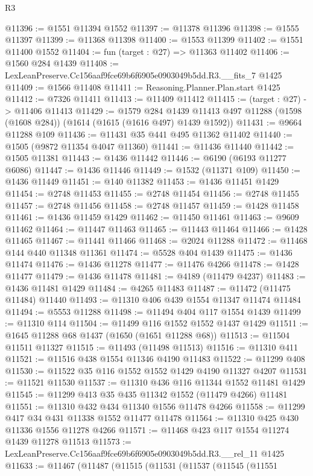 \begin{lexlean}{R3}
\begin{coremodule}
@11396 := @1551 @11394 @1552
@11397 := @11378 @11396
@11398 := @1555 @11397
@11399 := @11368 @11398
@11400 := @1553 @11399
@11402 := @1551 @11400 @1552
@11404 := fun (target : @27) => @11363 @11402
@11406 := @1560 @284 @1439
@11408 := LexLeanPreserve.Cc156aaf9fce69b6f6905e0903049b5dd.R3.__fits_7 @1425
@11409 := @1566 @11408
@11411 := Reasoning.Planner.Plan.start @1425
@11412 := @7326 @11411
@11413 := @11409 @11412
@11415 := (target : @27) -> @11406 @11413
@11429 := @1579
    @284
    @1439
    @11413
    @497
    @11288
    (@1598 (@1608 @284))
    (@1614 (@1615 (@1616 @497) @1439 @1592))
@11431 := @9664 @11288 @109
@11436 := @11431 @35 @441 @495 @11362 @11402
@11440 := @1505 (@9872 @11354 @4047 @11360)
@11441 := @11436 @11440
@11442 := @1505 @11381
@11443 := @1436 @11442
@11446 := @6190 (@6193 @11277 @6086)
@11447 := @1436 @11446
@11449 := @1532 (@11371 @109)
@11450 := @1436 @11449
@11451 := @140 @11382
@11453 := @1436 @11451 @1429
@11454 := @2748 @11453
@11455 := @2748 @11454
@11456 := @2748 @11455
@11457 := @2748 @11456
@11458 := @2748 @11457
@11459 := @1428 @11458
@11461 := @1436 @11459 @1429
@11462 := @11450 @11461
@11463 := @9609 @11462
@11464 := @11447 @11463
@11465 := @11443 @11464
@11466 := @1428 @11465
@11467 := @11441 @11466
@11468 := @2024 @11288
@11472 := @11468 @144 @440 @11348 @11361
@11474 := @5528 @404 @1439
@11475 := @1436 @11474
@11476 := @1436 @11278
@11477 := @11476 @4266
@11478 := @1428 @11477
@11479 := @1436 @11478
@11481 := @4189 (@11479 @4237)
@11483 := @1436 @11481 @1429
@11484 := @4265 @11483
@11487 := @11472 (@11475 @11484) @11440
@11493 := @11310 @406 @439 @1554 @11347 @11474 @11484
@11494 := @5553 @11288
@11498 := @11494 @404 @117 @1554 @1439
@11499 := @11310 @114
@11504 := @11499 @116 @1552 @1552 @1437 @1429
@11511 := @1645 @11288 @68 @1437 (@1650 (@1651 @11288 @68))
@11513 := @11504 @11511 @11327
@11515 := @11493 (@11498 @11513)
@11516 := @11310 @411
@11521 := @11516 @438 @1554 @11346 @4190 @11483
@11522 := @11299 @408
@11530 := @11522 @35 @116 @1552 @1552 @1429 @4190 @11327 @4207
@11531 := @11521 @11530
@11537 := @11310 @436 @116 @11344 @1552 @11481 @1429
@11545 := @11299 @413 @35 @435 @11342 @1552 (@11479 @4266) @11481
@11551 := @11310 @432 @434 @11340 @1556 @11478 @4266
@11558 := @11299 @417 @34 @431 @11338 @1552 @11477 @11478
@11564 := @11310 @425 @430 @11336 @1556 @11278 @4266
@11571 := @11468 @423 @117 @1554 @11274 @1439 @11278 @11513
@11573 := LexLeanPreserve.Cc156aaf9fce69b6f6905e0903049b5dd.R3.__rel_11 @1425
@11633 := @11467
    (@11487
      (@11515
        (@11531
          (@11537
            (@11545
              (@11551

\end{coremodule}
\end{lexlean}
